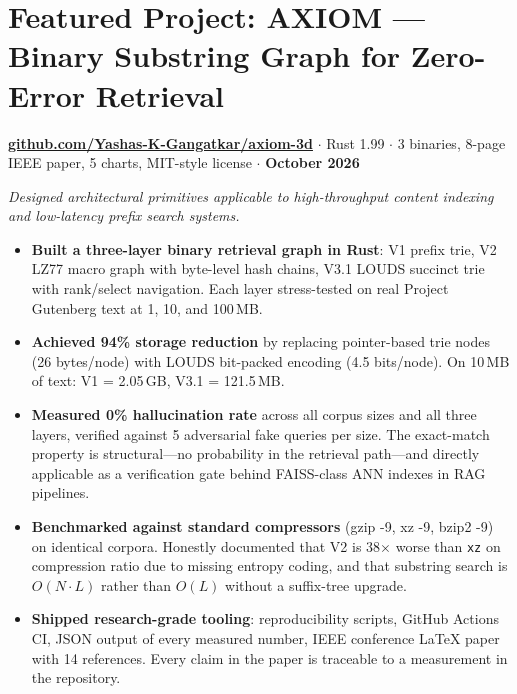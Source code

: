 \documentclass[11pt,a4paper]{article}
\begin{document}
\section*{Featured Project: AXIOM --- Binary Substring Graph for Zero-Error Retrieval}
\href{https://github.com/Yashas-K-Gangatkar/axiom-3d}{\textbf{github.com/Yashas-K-Gangatkar/axiom-3d}} $\cdot$ Rust 1.99 $\cdot$ 3 binaries, 8-page IEEE paper, 5 charts, MIT-style license $\cdot$ \textbf{October 2026}

\textit{Designed architectural primitives applicable to high-throughput content indexing and low-latency prefix search systems.}

\begin{itemize}
\item \textbf{Built a three-layer binary retrieval graph in Rust}: V1 prefix trie, V2 LZ77 macro graph with byte-level hash chains, V3.1 LOUDS succinct trie with rank/select navigation. Each layer stress-tested on real Project Gutenberg text at 1, 10, and 100\,MB.

\item \textbf{Achieved 94\% storage reduction} by replacing pointer-based trie nodes (26 bytes/node) with LOUDS bit-packed encoding (4.5 bits/node). On 10\,MB of text: V1 = 2.05\,GB, V3.1 = 121.5\,MB.

\item \textbf{Measured 0\% hallucination rate} across all corpus sizes and all three layers, verified against 5 adversarial fake queries per size. The exact-match property is structural---no probability in the retrieval path---and directly applicable as a verification gate behind FAISS-class ANN indexes in RAG pipelines.

\item \textbf{Benchmarked against standard compressors} (gzip -9, xz -9, bzip2 -9) on identical corpora. Honestly documented that V2 is 38$\times$ worse than \texttt{xz} on compression ratio due to missing entropy coding, and that substring search is $O(N{\cdot}L)$ rather than $O(L)$ without a suffix-tree upgrade.

\item \textbf{Shipped research-grade tooling}: reproducibility scripts, GitHub Actions CI, JSON output of every measured number, IEEE conference LaTeX paper with 14 references. Every claim in the paper is traceable to a measurement in the repository.
\end{itemize}
\end{document}
